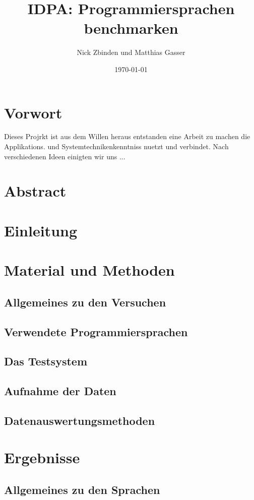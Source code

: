 \documentclass{fancydocument}
\title{IDPA: Programmiersprachen benchmarken}
\author{Nick Zbinden und Matthias Gasser}
\date{\today}
\begin{document}
\maketitle
\thispagestyle{fancy}

\section{Vorwort}

Dieses Projrkt ist aus dem Willen heraus entstanden eine Arbeit zu
machen die Applikations. und Systemtechnikenkenntniss nuetzt und
verbindet. Nach verschiedenen Ideen einigten wir uns ... 

\section{Abstract}
\section{Einleitung}
\section{Material und Methoden}
\subsection{Allgemeines zu den Versuchen}
\subsection{Verwendete Programmiersprachen}
\subsection{Das Testsystem}
\subsection{Aufnahme der Daten}
\subsection{Datenauswertungsmethoden}
\section{Ergebnisse}

\subsection{Allgemeines zu den Sprachen}
\end{document}

